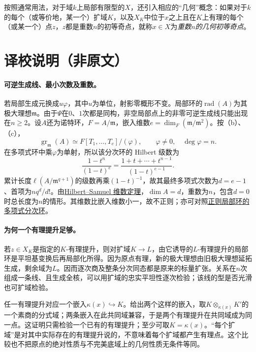 \documentclass[openany,fontset=fandol]{ctexbook}
\newcommand{\m}{\mathfrak m}
\DeclareMathOperator{\gr}{gr}
\begin{document}
按照通常用法，对于域$k$上局部有限型的$X$，还引入相应的“几何”概念：如果对于$k$的每个（或等价地，某一个）扩域$K$，以及$X_K$中位于$x$之上且在$K$上有理的每个（或某一个）点$z$，$z$都是重数$n$的初等奇点，就称$x\in X$为\emph{重数$n$的几何初等奇点}。
\section*{译校说明（非原文）}
\paragraph{可逆生成线、最小次数及重数。}
若局部生成元换成$u\varphi$，其中$u$为单位，射影零概形不变。局部环的$\operatorname{rad}(A)$为其极大理想$\m$。由于$\Psi$在$0$、$1$次都是同构，非空局部点上的非零可逆生成线只能出现在$n\ge2$。设$A$还为诺特环，$F=A/\m$，嵌入维数$e=\dim_F(\m/\m^2)$。按（b）、（c），
\[
\gr_{\m}(A)\simeq F[T_1,\ldots,T_e]/(\varphi),
\qquad \varphi\ne0,\quad \deg\varphi=n.
\]
在多项式环中乘$\varphi$为单射，所以该分次环的 Hilbert 级数为
\[
\frac{1-t^n}{(1-t)^e}
=\frac{1+t+\cdots+t^{n-1}}{(1-t)^{e-1}}.
\]
累计长度$\ell(A/\m^{q+1})$的级数再乘$(1-t)^{-1}$，故其最终多项式次数为$d=e-1$、首项为$nq^d/d!$。由\href{https://stacks.math.columbia.edu/tag/00KQ}{Hilbert--Samuel 维数定理}，$\dim A=d$，重数为$n$，包含$d=0$时总长度为$n$的情形。其维数比嵌入维数小一，故不正则；亦可对照\href{https://stacks.math.columbia.edu/tag/00NO}{正则局部环的多项式分次环}。

\paragraph{为何一个有理提升足够。}
若$z\in X_K$是指定的$K$-有理提升，则对扩域$K\to L$，由它诱导的$L$-有理提升的局部环是平坦基变换后再局部化所得。因为原点有理，新的极大理想由旧极大理想延拓生成，剩余域为$L$。因而逐次商及整条分次同态都是原来的标量扩张。关系在$n$次组成一条线、且生成全核，可以用扩域的忠实平坦性逐次检验；该线的型是否光滑也可扩域检验。

任一有理提升对应一个嵌入$\kappa(x)\hookrightarrow K$。给出两个这样的嵌入，取$K\otimes_{\kappa(x)}K'$的一个素商的分式域；两条嵌入在此共同域兼容，于是两个有理提升在共同域成为同一点。这证明只需检验一个已有的有理提升；至少可取$K=\kappa(x)$。“每个扩域”是对其中实际存在的有理提升说的，不意味着每个扩域都产生有理点。这个比较也不把原点的绝对性质与不完美底域上的几何性质无条件等同。
\end{document}
